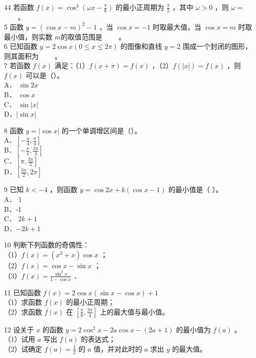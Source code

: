 \documentclass[10pt]{article}
\begin{document}
44 若函数 \(f(x)=\cos ^{4}\left(\omega x-\frac{\pi}{6}\right)\) 的最小正周期为 \(\frac{\pi}{5}\) ，其中 \(\omega>0\) ，则 \(\omega=\) \(\qquad\)。\\
5 函数 \(y=(\cos x-m)^{2}-1\) ，当 \(\cos x=-1\) 时取最大值，当 \(\cos x=m\) 时取最小值，则实数 \(m\)的取值范围是 \(\qquad\)。\\
6 已知函数 \(y=2 \cos x(0 \leqslant x \leqslant 2 \pi)\) 的图像和直线 \(y=2\) 围成一个封闭的图形，则其面积为 \(\qquad\)。\\
7 若函数 \(f(x)\) 满足：（1）\(f(x+\pi)=f(x)\) ，（2）\(f(|x|)=f(x)\) ，则 \(f(x)\) 可以是（）。\\
A． \(\sin 2 x\)\\
B． \(\cos x\)\\
C． \(\sin |x|\)\\
D．\(|\sin x|\)

8 函数 \(y=|\cos x|\) 的一个单调增区间是（）。\\
A．\(\left[-\frac{\pi}{4}, \frac{\pi}{4}\right]\)\\
B．\(\left[-\frac{\pi}{4}, \frac{3 \pi}{4}\right]\)\\
C．\(\left[\pi, \frac{3 \pi}{2}\right]\)\\
D．\(\left[\frac{3 \pi}{2}, 2 \pi\right]\)

9 已知 \(k<-4\) ，则函数 \(y=\cos 2 x+k(\cos x-1)\) 的最小值是（ ）。\\
A． 1\\
B．-1\\
C． \(2 k+1\)\\
D．\(-2 k+1\)

10 判断下列函数的奇偶性：\\
（1）\(f(x)=\left(x^{3}+x\right) \cos x\) ；\\
（2）\(f(x)=\cos x-\sin x\) ；\\
（3）\(f(x)=\frac{\sin ^{2} x}{1-\cos x}\) ．

11 已知函数 \(f(x)=2 \cos x(\sin x-\cos x)+1\)\\
（1）求函数 \(f(x)\) 的最小正周期；\\
（2）求函数 \(f(x)\) 在 \(\left[\frac{\pi}{8}, \frac{3 \pi}{4}\right]\) 上的最大值与最小值。

12 设关于 \(x\) 的函数 \(y=2 \cos ^{2} x-2 a \cos x-(2 a+1)\) 的最小值为 \(f(a)\) 。\\
（1）试用 \(a\) 写出 \(f(a)\) 的表达式；\\
（2）试确定 \(f(a)=\frac{1}{2}\) 的 \(a\) 值，并对此时的 \(a\) 求出 \(y\) 的最大值。
\end{document}
